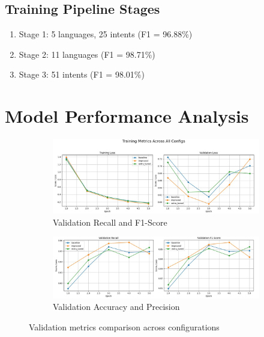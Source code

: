 \documentclass{ecai}
\begin{document}
\subsection{Training Pipeline Stages}
\begin{enumerate}
    \item Stage 1: 5 languages, 25 intents (F1 = 96.88\%)
    \item Stage 2: 11 languages (F1 = 98.71\%)
    \item Stage 3: 51 intents (F1 = 98.01\%)
\end{enumerate}

\section{Model Performance Analysis}

\begin{figure}[H]
    \centering
    \begin{subfigure}{0.48\textwidth}
        \includegraphics[width=\linewidth]{training_matrices_1.jpeg}
        \caption{Validation Recall and F1-Score}
    \end{subfigure}
    \hfill
    \begin{subfigure}{0.48\textwidth}
        \includegraphics[width=\linewidth]{training_matrices_2.jpeg}
        \caption{Validation Accuracy and Precision}
    \end{subfigure}
    \caption{Validation metrics comparison across configurations}
    \label{fig:val_metrics}
\end{figure}
\end{document}

